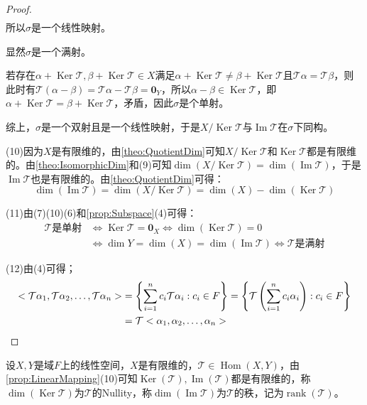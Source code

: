 \begin{proof}
\begin{align*}
	\end{align*}
	所以$\sigma$是一个线性映射。\par
	显然$\sigma$是一个满射。\par
	若存在$\alpha+\operatorname{Ker}\mathcal{T},\beta+\operatorname{Ker}\mathcal{T}\in X$满足$\alpha+\operatorname{Ker}\mathcal{T}\ne\beta+\operatorname{Ker}\mathcal{T}$且$\mathcal{T}\alpha=\mathcal{T}\beta$，则此时有$\mathcal{T}(\alpha-\beta)=\mathcal{T}\alpha-\mathcal{T}\beta=\mathbf{0}_Y$，所以$\alpha-\beta\in\operatorname{Ker}\mathcal{T}$，即$\alpha+\operatorname{Ker}\mathcal{T}=\beta+\operatorname{Ker}\mathcal{T}$，矛盾，因此$\sigma$是个单射。\par
	综上，$\sigma$是一个双射且是一个线性映射，于是$X/\operatorname{Ker}\mathcal{T}$与$\operatorname{Im}\mathcal{T}$在$\sigma$下同构。\par
	(10)因为$X$是有限维的，由\cref{theo:QuotientDim}可知$X/\operatorname{Ker}\mathcal{T}$和$\operatorname{Ker}\mathcal{T}$都是有限维的。由\cref{theo:IsomorphicDim}和(9)可知$\dim(X/\operatorname{Ker}\mathcal{T})=\dim(\operatorname{Im}\mathcal{T})$，于是$\operatorname{Im}\mathcal{T}$也是有限维的。由\cref{theo:QuotientDim}可得：
	\begin{equation*}
		\dim(\operatorname{Im}\mathcal{T})=\dim(X/\operatorname{Ker}\mathcal{T})=\dim(X)-\dim(\operatorname{Ker}\mathcal{T})
	\end{equation*}\par
	(11)由(7)(10)(6)和\cref{prop:Subspace}(4)可得：
	\begin{align*}
		\mathcal{T}\text{是单射}
		&\iff\operatorname{Ker}\mathcal{T}=\mathbf{0}_X	\iff\dim(\operatorname{Ker}\mathcal{T})=0 \\
		&\iff\dim Y=\dim(X)=\dim(\operatorname{Im}\mathcal{T})
		\iff\mathcal{T}\text{是满射}
	\end{align*}\par
	(12)由(4)可得；
	\begin{align*}
		<\mathcal{T}\alpha_1, \mathcal{T}\alpha_2, \dots, \mathcal{T}\alpha_{n}>&=\left\{\sum_{i=1}^{n}c_i\mathcal{T}\alpha_i:c_i\in F\right\}=\left\{\mathcal{T}\left(\sum_{i=1}^{n}c_i\alpha_i\right):c_i\in F\right\} \\
		&=\mathcal{T}<\alpha_1, \alpha_2, \dots, \alpha_{n}>\qedhere
	\end{align*}
\end{proof}
\begin{definition}
	设$X,Y$是域$F$上的线性空间，$X$是有限维的，$\mathcal{T}\in\operatorname{Hom}(X,Y)$，由\cref{prop:LinearMapping}(10)可知$\operatorname{Ker}(\mathcal{T}),\operatorname{Im}(\mathcal{T})$都是有限维的，称$\dim(\operatorname{Ker}\mathcal{T})$为$\mathcal{T}$的\gls{Nullity}，称$\dim(\operatorname{Im}\mathcal{T})$为$\mathcal{T}$的秩，记为$\operatorname{rank}(\mathcal{T})$。
\end{definition}
